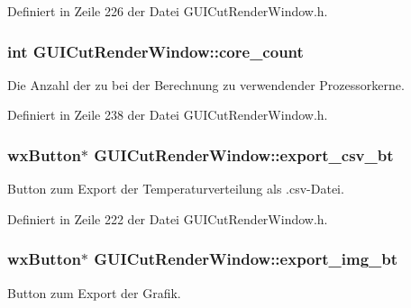 Definiert in Zeile 226 der Datei G\-U\-I\-Cut\-Render\-Window.\-h.

\hypertarget{classGUICutRenderWindow_a365103460aeafd2173c0a9360cc0caa1}{
\subsubsection[{core\-\_\-count}]{\setlength{\rightskip}{0pt plus 5cm}int G\-U\-I\-Cut\-Render\-Window\-::core\-\_\-count\hspace{0.3cm}{\ttfamily [private]}}}\label{classGUICutRenderWindow_a365103460aeafd2173c0a9360cc0caa1}
Die Anzahl der zu bei der Berechnung zu verwendender Prozessorkerne. 

Definiert in Zeile 238 der Datei G\-U\-I\-Cut\-Render\-Window.\-h.

\hypertarget{classGUICutRenderWindow_a1613155eefe8309903858f9427b263de}{
\subsubsection[{export\-\_\-csv\-\_\-bt}]{\setlength{\rightskip}{0pt plus 5cm}wx\-Button$\ast$ G\-U\-I\-Cut\-Render\-Window\-::export\-\_\-csv\-\_\-bt\hspace{0.3cm}{\ttfamily [private]}}}\label{classGUICutRenderWindow_a1613155eefe8309903858f9427b263de}
Button zum Export der Temperaturverteilung als .csv-\/\-Datei. 

Definiert in Zeile 222 der Datei G\-U\-I\-Cut\-Render\-Window.\-h.

\hypertarget{classGUICutRenderWindow_ac0b26b746d6339154256d81da8cd7aed}{
\subsubsection[{export\-\_\-img\-\_\-bt}]{\setlength{\rightskip}{0pt plus 5cm}wx\-Button$\ast$ G\-U\-I\-Cut\-Render\-Window\-::export\-\_\-img\-\_\-bt\hspace{0.3cm}{\ttfamily [private]}}}\label{classGUICutRenderWindow_ac0b26b746d6339154256d81da8cd7aed}
Button zum Export der Grafik. 

